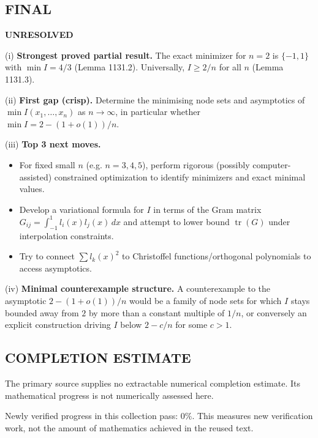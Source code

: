 \subsection*{FINAL}
\textbf{UNRESOLVED}

(i) \textbf{Strongest proved partial result.}
The exact minimizer for $n=2$ is $\{-1,1\}$ with $\min I=4/3$ (Lemma 1131.2). Universally, $I\ge 2/n$ for all $n$ (Lemma 1131.3).

(ii) \textbf{First gap (crisp).}
Determine the minimising node sets and asymptotics of $\min I(x_1,\dots,x_n)$ as $n\to\infty$, in particular whether $\min I = 2-(1+o(1))/n$.

(iii) \textbf{Top 3 next moves.}
\begin{itemize}
\item For fixed small $n$ (e.g. $n=3,4,5$), perform rigorous (possibly computer-assisted) constrained optimization to identify minimizers and exact minimal values.
\item Develop a variational formula for $I$ in terms of the Gram matrix $G_{ij}=\int_{-1}^1 l_i(x)l_j(x)\,dx$ and attempt to lower bound $\operatorname{tr}(G)$ under interpolation constraints.
\item Try to connect $\sum l_k(x)^2$ to Christoffel functions/orthogonal polynomials to access asymptotics.
\end{itemize}

(iv) \textbf{Minimal counterexample structure.}
A counterexample to the asymptotic $2-(1+o(1))/n$ would be a family of node sets for which $I$ stays bounded away from $2$ by more than a constant multiple of $1/n$, or conversely an explicit construction driving $I$ below $2- c/n$ for some $c>1$.




\subsection*{COMPLETION ESTIMATE}
The primary source supplies no extractable numerical completion estimate. Its mathematical progress is not numerically assessed here.

Newly verified progress in this collection pass: $0\%$. This measures new verification work, not the amount of mathematics achieved in the reused text.
